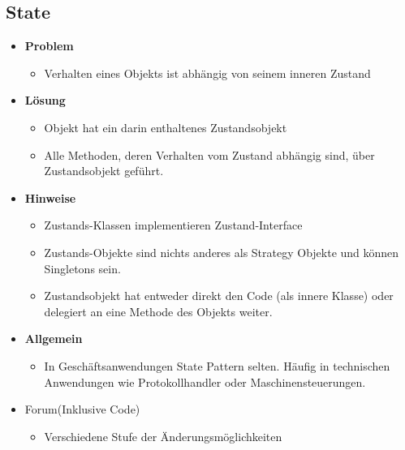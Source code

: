 \documentclass[../ZF_SWEN1.tex]{subfiles}
\begin{document}
\subsection{State}
\begin{itemize}
	\item \textbf{Problem}
	\begin{itemize}
		\item Verhalten eines Objekts ist abhängig von seinem inneren Zustand
	\end{itemize}
	\item \textbf{Lösung}
	\begin{itemize}
		\item Objekt hat ein darin enthaltenes Zustandsobjekt
		\item Alle Methoden, deren Verhalten vom Zustand abhängig sind, über Zustandsobjekt geführt.
	\end{itemize}
	\item \textbf{Hinweise}
	\begin{itemize}
		\item Zustands-Klassen implementieren Zustand-Interface
		\item Zustands-Objekte sind nichts anderes als Strategy Objekte und können Singletons sein.
		\item Zustandsobjekt hat entweder direkt den Code (als innere Klasse) oder delegiert an eine Methode des Objekts weiter.
	\end{itemize}
	\item \textbf{Allgemein}
	\begin{itemize}
		\item In Geschäftsanwendungen State Pattern selten. Häufig in technischen Anwendungen wie Protokollhandler oder Maschinensteuerungen.
	\end{itemize}
	\item Forum(Inklusive Code)
	\begin{itemize}
		\item Verschiedene Stufe der Änderungsmöglichkeiten
	\end{itemize}
\end{itemize}
\end{document}
